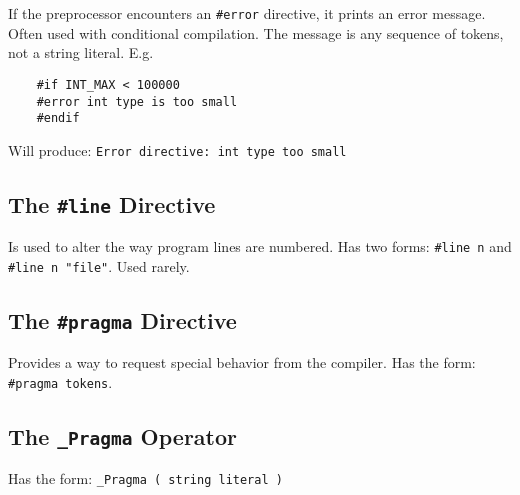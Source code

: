 \documentclass[openany]{book}
\begin{document}
    If the preprocessor encounters an \texttt{\#error} directive, it prints an error message. Often used with conditional compilation. The message is any sequence of tokens, not a string literal. E.g.

    \begin{lstlisting}
    #if INT_MAX < 100000
    #error int type is too small
    #endif
    \end{lstlisting}
    Will produce: \texttt{Error directive: int type too small}
    
    \subsection*{The \texttt{\#line} Directive}
    Is used to alter the way program lines are numbered. Has two forms: \texttt{\#line n} and \texttt{\#line n "file"}. Used rarely.

    \subsection*{The \texttt{\#pragma} Directive}
    Provides a way to request special behavior from the compiler. Has the form: \texttt{\#pragma tokens}.

    \subsection*{The \texttt{\_Pragma} Operator}
    Has the form: \texttt{\_Pragma ( string literal )}
\end{document}
